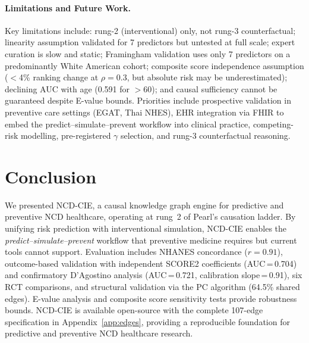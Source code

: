 \documentclass[runningheads]{llncs}
\begin{document}
\paragraph{Limitations and Future Work.}
Key limitations include: rung-2 (interventional) only, not rung-3
counterfactual; linearity assumption validated for 7 predictors
but untested at full scale; expert curation is slow and static;
Framingham validation uses only 7 predictors on a predominantly
White American cohort; composite score independence assumption
($<$4\% ranking change at $\rho=0.3$, but absolute risk may be
underestimated); declining AUC with age (0.591 for $>$60);
and causal sufficiency cannot be guaranteed despite E-value bounds.
Priorities include prospective validation in preventive care settings
(EGAT, Thai NHES), EHR integration via FHIR to embed the
predict--simulate--prevent workflow into clinical practice,
competing-risk modelling, pre-registered $\gamma$ selection,
and rung-3 counterfactual reasoning.

\section{Conclusion}\label{sec:conclusion}

We presented NCD-CIE, a causal knowledge graph engine for predictive
and preventive NCD healthcare, operating at rung~2 of Pearl's
causation ladder.
By unifying risk prediction with interventional simulation, NCD-CIE
enables the \emph{predict--simulate--prevent} workflow that preventive
medicine requires but current tools cannot support.
Evaluation includes NHANES concordance ($r = 0.91$), outcome-based
validation with independent SCORE2 coefficients (AUC\,=\,0.704)
and confirmatory D'Agostino analysis (AUC\,=\,0.721,
calibration slope\,=\,0.91), six RCT comparisons, and structural
validation via the PC algorithm (64.5\% shared edges).
E-value analysis and composite score sensitivity tests provide
robustness bounds.
NCD-CIE is available open-source with the complete 107-edge
specification in Appendix~\ref{app:edges}, providing a reproducible
foundation for predictive and preventive NCD healthcare research.
\end{document}
